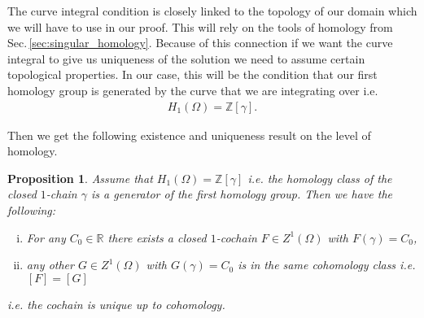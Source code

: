 \documentclass[12pt,a4paper]{article}
\numberwithin{equation}{subsection}
\numberwithin{lemma}{subsection}
\newtheorem{proposition}[lemma]{Proposition}
\theoremstyle{definition}
\newcommand{\integers}{\mathbb{Z}}
\newcommand{\real}{\mathbb{R}}
\begin{document}
The curve integral condition is closely linked to the topology of our domain 
which we will have to use in our proof.
This will rely on the tools of homology from Sec.\,\ref{sec:singular_homology}. 
Because of this connection if we want the curve integral
to give us uniqueness of the solution we need to assume certain topological 
properties. In our case, this will be the condition that our first 
homology group is generated by the curve that we are integrating over i.e.
\begin{align*}
    H_1(\Omega) = \integers [\gamma].
\end{align*}

Then we get the following existence and uniqueness result on the 
level of homology.

\begin{proposition}\label{prop:uniqueness_cochain}
    Assume that $H_1(\Omega) = \integers [\gamma]$ i.e. the homology 
    class of the 
    closed $1$-chain $\gamma$ is a generator of the first homology group.
    Then we have the following:
    \begin{enumerate}[(i)]
        \item For any $C_0 \in \real$ there exists a closed $1$-cochain 
            $F \in Z^1(\Omega)$ with $F(\gamma) = C_0$,
        \item any other $G \in Z^1(\Omega)$ with $G(\gamma) = C_0$ 
            is in the same cohomology class i.e. $[F] = [G]$
    \end{enumerate}
    i.e. the cochain is unique up to cohomology.
\end{proposition}
\end{document}
